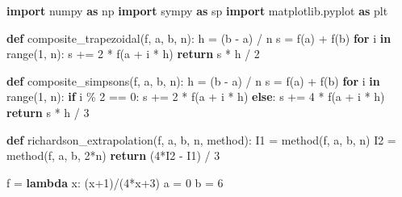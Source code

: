 \documentclass[
  a4paper,
]{article}
\newenvironment{Shaded}{}{}
\newcommand{\BuiltInTok}[1]{\textcolor[rgb]{0.00,0.50,0.00}{#1}}
\newcommand{\ControlFlowTok}[1]{\textcolor[rgb]{0.00,0.44,0.13}{\textbf{#1}}}
\newcommand{\DecValTok}[1]{\textcolor[rgb]{0.25,0.63,0.44}{#1}}
\newcommand{\ImportTok}[1]{\textcolor[rgb]{0.00,0.50,0.00}{\textbf{#1}}}
\newcommand{\KeywordTok}[1]{\textcolor[rgb]{0.00,0.44,0.13}{\textbf{#1}}}
\newcommand{\NormalTok}[1]{#1}
\newcommand{\OperatorTok}[1]{\textcolor[rgb]{0.40,0.40,0.40}{#1}}
\begin{document}
\begin{Shaded}
\begin{Highlighting}[]
\ImportTok{import}\NormalTok{ numpy }\ImportTok{as}\NormalTok{ np}
\ImportTok{import}\NormalTok{ sympy }\ImportTok{as}\NormalTok{ sp}
\ImportTok{import}\NormalTok{ matplotlib.pyplot }\ImportTok{as}\NormalTok{ plt}

\KeywordTok{def}\NormalTok{ composite\_trapezoidal(f, a, b, n):}
\NormalTok{    h }\OperatorTok{=}\NormalTok{ (b }\OperatorTok{{-}}\NormalTok{ a) }\OperatorTok{/}\NormalTok{ n}
\NormalTok{    s }\OperatorTok{=}\NormalTok{ f(a) }\OperatorTok{+}\NormalTok{ f(b)}
    \ControlFlowTok{for}\NormalTok{ i }\KeywordTok{in} \BuiltInTok{range}\NormalTok{(}\DecValTok{1}\NormalTok{, n):}
\NormalTok{        s }\OperatorTok{+=} \DecValTok{2} \OperatorTok{*}\NormalTok{ f(a }\OperatorTok{+}\NormalTok{ i }\OperatorTok{*}\NormalTok{ h)}
    \ControlFlowTok{return}\NormalTok{ s }\OperatorTok{*}\NormalTok{ h }\OperatorTok{/} \DecValTok{2}

\KeywordTok{def}\NormalTok{ composite\_simpsons(f, a, b, n):}
\NormalTok{    h }\OperatorTok{=}\NormalTok{ (b }\OperatorTok{{-}}\NormalTok{ a) }\OperatorTok{/}\NormalTok{ n}
\NormalTok{    s }\OperatorTok{=}\NormalTok{ f(a) }\OperatorTok{+}\NormalTok{ f(b)}
    \ControlFlowTok{for}\NormalTok{ i }\KeywordTok{in} \BuiltInTok{range}\NormalTok{(}\DecValTok{1}\NormalTok{, n):}
        \ControlFlowTok{if}\NormalTok{ i }\OperatorTok{\%} \DecValTok{2} \OperatorTok{==} \DecValTok{0}\NormalTok{:}
\NormalTok{            s }\OperatorTok{+=} \DecValTok{2} \OperatorTok{*}\NormalTok{ f(a }\OperatorTok{+}\NormalTok{ i }\OperatorTok{*}\NormalTok{ h)}
        \ControlFlowTok{else}\NormalTok{:}
\NormalTok{            s }\OperatorTok{+=} \DecValTok{4} \OperatorTok{*}\NormalTok{ f(a }\OperatorTok{+}\NormalTok{ i }\OperatorTok{*}\NormalTok{ h)}
    \ControlFlowTok{return}\NormalTok{ s }\OperatorTok{*}\NormalTok{ h }\OperatorTok{/} \DecValTok{3}

\KeywordTok{def}\NormalTok{ richardson\_extrapolation(f, a, b, n, method):}
\NormalTok{    I1 }\OperatorTok{=}\NormalTok{ method(f, a, b, n)}
\NormalTok{    I2 }\OperatorTok{=}\NormalTok{ method(f, a, b, }\DecValTok{2}\OperatorTok{*}\NormalTok{n)}
    \ControlFlowTok{return}\NormalTok{ (}\DecValTok{4}\OperatorTok{*}\NormalTok{I2 }\OperatorTok{{-}}\NormalTok{ I1) }\OperatorTok{/} \DecValTok{3}

\NormalTok{f }\OperatorTok{=} \KeywordTok{lambda}\NormalTok{ x: (x}\OperatorTok{+}\DecValTok{1}\NormalTok{)}\OperatorTok{/}\NormalTok{(}\DecValTok{4}\OperatorTok{*}\NormalTok{x}\OperatorTok{+}\DecValTok{3}\NormalTok{)}
\NormalTok{a }\OperatorTok{=} \DecValTok{0}
\NormalTok{b }\OperatorTok{=} \DecValTok{6}


\end{Highlighting}
\end{Shaded}
\end{document}
